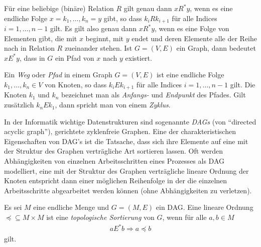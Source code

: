 \begin{rk}
    Für eine beliebige (binäre) Relation $R$ gilt genau dann $xR^*y$, wenn es
    eine endliche Folge $x=k_1,\dots,k_n=y$ gibt, so dass $k_iRk_{i+1}$ für alle
    Indices $i=1,\dots,n-1$ gilt. Es gilt also genau dann $xR^*y$, wenn es eine Folge von
    Elementen gibt, die mit $x$ beginnt, mit $y$ endet und deren Elemente alle der Reihe
    nach in Relation $R$ zueinander stehen. Ist $G=(V,E)$ ein Graph, dann bedeutet
    $xE^*y$, dass in $G$ ein Pfad von $x$ nach $y$ existiert.
\end{rk}

\begin{df}
    Ein \textit{Weg} oder \textit{Pfad} in einem Graph $G=(V,E)$ ist eine endliche Folge
    $k_1,\dots,k_n\in V$ von Knoten, so dass $k_iEk_{i+1}$ für alle Indices
    $i=1,\dots,n-1$ gilt. Die Knoten $k_1$ und $k_n$ bezeichnet man als \textit{Anfangs-}
    und \textit{Endpunkt} des Pfades. Gilt zusätzlich $k_nEk_1$, dann spricht man von
    einem \textit{Zyklus}.
\end{df}


\begin{rk}
    In der Informatik wichtige Datenstrukturen sind sogenannte \textit{DAGs} (von ``directed acyclic graph''), gerichtete zyklenfreie Graphen. Eine der charakteristischen Eigenschaften von DAG's ist die Tatsache, dass sich ihre Elemente auf eine mit der Struktur des Graphen verträgliche Art sortieren lassen. Oft werden Abhängigkeiten von einzelnen Arbeitsschritten eines Prozesses als DAG modelliert, eine mit der Struktur des Graphen verträgliche lineare Ordnung der Knoten entspricht dann einer möglichen Reihenfolge in der die einzelnen Arbeitsschritte abgearbeitet werden können (ohne Abhängigkeiten zu verletzen).
\end{rk}


\begin{df}
    Es sei $M$ eine endliche Menge und $G=(M,E)$ ein DAG. Eine lineare Ordnung $\preceq\subseteq M\times M$ ist eine \textit{topologische Sortierung} von $G$, wenn für alle $a,b\in M$
    \begin{align*}
    a E^* b  \Rightarrow a\preceq b
    \end{align*}
    gilt.
\end{df}

